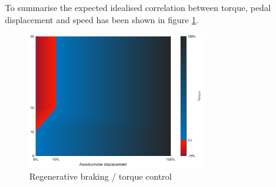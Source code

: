 To summarise the expected idealised correlation between torque, pedal displacement and speed has been shown in figure \ref{fig:regen_ideal}.

\begin{figure}[H]
    \centering
        \includegraphics[height=5.8cm]{figures/regen_ideal}
        \caption{Regenerative braking / torque control}
        \label{fig:regen_ideal}
\end{figure}





